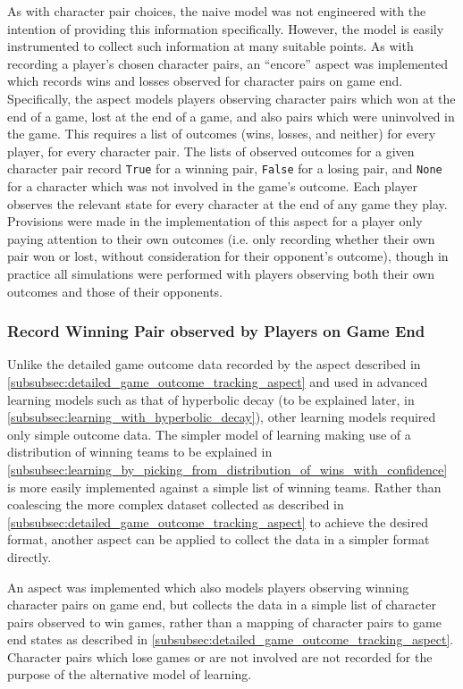 As with character pair choices, the naive model was not engineered with the intention of providing this information specifically.
However, the model is easily instrumented to collect such information at many suitable points. As with recording
a player's chosen character pairs, an ``encore'' aspect was implemented which records wins and losses observed for character pairs
on game end. Specifically, the aspect models players observing character pairs which won at the end of a game, lost at the end of
a game, and also pairs which were uninvolved in the game. This requires a list of outcomes (wins, losses, and neither) for every player, for every character pair.
The lists of observed outcomes for a given character pair record 
\lstinline{True} for a winning pair, \lstinline{False} for a losing pair, and \lstinline{None} for a character which was not
involved in the game's outcome. Each player observes the relevant state for every character at the end of any game they play. 
Provisions were made in the implementation of this aspect for a player only paying attention to
their own outcomes (i.e. only recording whether their own pair won or lost, without consideration for their opponent's outcome),
though in practice all simulations were performed with players observing both their own outcomes and those of their opponents.

\subsubsection{Record Winning Pair observed by Players on Game End}\label{subsubsec:aspect_to_observe_winning_pair}
Unlike the detailed game outcome data recorded by the aspect described in \cref{subsubsec:detailed_game_outcome_tracking_aspect} and used
in advanced learning models such as that of hyperbolic decay (to be explained later, in \cref{subsubsec:learning_with_hyperbolic_decay}),
other learning models required only simple outcome data. The simpler model of learning making use of
a distribution of winning teams to be explained in \cref{subsubsec:learning_by_picking_from_distribution_of_wins_with_confidence}
is more easily implemented against a simple list of winning teams. Rather than coalescing the more complex dataset collected as described in
\cref{subsubsec:detailed_game_outcome_tracking_aspect} to achieve the desired format, another aspect can be applied
to collect the data in a simpler format directly.

An aspect was implemented which also models players observing winning character pairs on game end, but collects the data in a
simple list of character pairs observed to win games, rather than a mapping of character pairs to game end states as described in
\cref{subsubsec:detailed_game_outcome_tracking_aspect}. Character pairs which lose games or are not involved are not recorded for the purpose
of the alternative model of learning.

